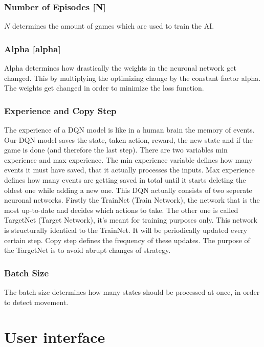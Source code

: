 \documentclass[12pt]{article}
\def\alpha{alpha}%
\def\({}%
\def\){}%
\begin{document}
\subsubsection{Number of Episodes [\(N\)]}
$N$ determines the amount of games which are used to train the AI.

\subsubsection{Alpha [\(\alpha\)]}
Alpha determines how drastically the weights in the neuronal network get changed. This by multiplying the optimizing change by the constant factor alpha. The weights get changed in order to minimize the loss function.

\subsubsection{Experience and Copy Step}\label{sssec:copy_step}
The experience of a DQN model is like in a human brain the memory of events. Our DQN model saves the state, taken action, reward, the new state and if the game is done (and therefore the last step). There are two variables min experience and max experience. The min experience variable defines how many events it must have saved, that it actually processes the inputs. Max experience defines how many events are getting saved in total until it starts deleting the oldest one while adding a new one. 
This DQN actually consists of two seperate neuronal networks. Firstly the TrainNet (Train Network), the network that is the most up-to-date and decides which actions to take. The other one is called TargetNet (Target Network), it’s meant for training purposes only. This network is structurally identical to the TrainNet. It will be periodically updated every certain step. Copy step defines the frequency of these updates. The purpose of the TargetNet is to avoid abrupt changes of strategy. 

\subsubsection{Batch Size}
The batch size determines how many states should be processed at once, in order to detect movement. 
\section{User interface}
\end{document}
